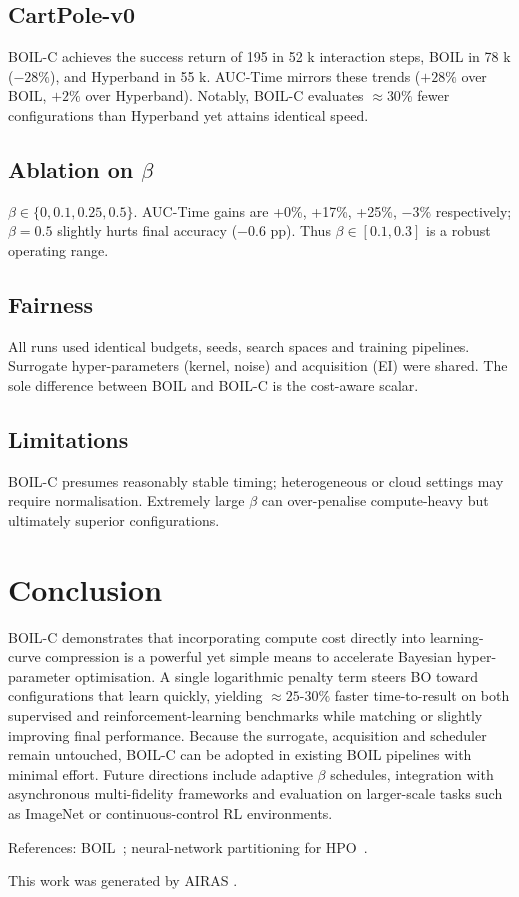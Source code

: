 \documentclass{article} %
\begin{document}
\subsection{CartPole-v0}
BOIL-C achieves the success return of 195 in 52 k interaction steps, BOIL in 78 k (\(-28\%\)), and Hyperband in 55 k. AUC-Time mirrors these trends (\(+28\%\) over BOIL, \(+2\%\) over Hyperband). Notably, BOIL-C evaluates \(\approx 30\%\) fewer configurations than Hyperband yet attains identical speed.

\subsection{Ablation on \(\beta\)}
\(\beta\in\{0,0.1,0.25,0.5\}\). AUC-Time gains are +0\%, +17\%, +25\%, \(-3\%\) respectively; \(\beta=0.5\) slightly hurts final accuracy (\(-0.6\) pp). Thus \(\beta\in[0.1,0.3]\) is a robust operating range.

\subsection{Fairness}
All runs used identical budgets, seeds, search spaces and training pipelines. Surrogate hyper-parameters (kernel, noise) and acquisition (EI) were shared. The sole difference between BOIL and BOIL-C is the cost-aware scalar.

\subsection{Limitations}
BOIL-C presumes reasonably stable timing; heterogeneous or cloud settings may require normalisation. Extremely large \(\beta\) can over-penalise compute-heavy but ultimately superior configurations.

\section{Conclusion}\label{sec:conclusion}%
BOIL-C demonstrates that incorporating compute cost directly into learning-curve compression is a powerful yet simple means to accelerate Bayesian hyper-parameter optimisation. A single logarithmic penalty term steers BO toward configurations that learn quickly, yielding \(\approx 25\text{-}30\%\) faster time-to-result on both supervised and reinforcement-learning benchmarks while matching or slightly improving final performance. Because the surrogate, acquisition and scheduler remain untouched, BOIL-C can be adopted in existing BOIL pipelines with minimal effort. Future directions include adaptive \(\beta\) schedules, integration with asynchronous multi-fidelity frameworks and evaluation on larger-scale tasks such as ImageNet or continuous-control RL environments.

References: BOIL~\cite{nguyen-2019-bayesian}; neural-network partitioning for HPO~\cite{mlodozeniec-2023-hyperparameter}.

This work was generated by \textsc{AIRAS} \citep{airas2025}.



\end{document}
